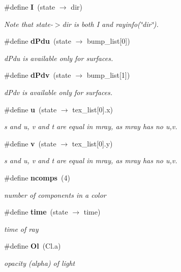 \begin{CompactItemize}
\#define {\bf I}\ (state $\rightarrow$ dir)
\begin{CompactList}\small\item\em Note that state-$>$dir is both I and rayinfo(\char`\"{}dir\char`\"{}). \item\end{CompactList}\item 
\#define {\bf d\-Pdu}\ (state $\rightarrow$ bump\_\-list[0])
\begin{CompactList}\small\item\em d\-Pdu is available only for surfaces. \item\end{CompactList}\item 
\#define {\bf d\-Pdv}\ (state $\rightarrow$ bump\_\-list[1])
\begin{CompactList}\small\item\em d\-Pdv is available only for surfaces. \item\end{CompactList}\item 
\#define {\bf u}\ (state $\rightarrow$ tex\_\-list[0].x)
\begin{CompactList}\small\item\em s and u, v and t are equal in mray, as mray has no u,v. \item\end{CompactList}\item 
\#define {\bf v}\ (state $\rightarrow$ tex\_\-list[0].y)
\begin{CompactList}\small\item\em s and u, v and t are equal in mray, as mray has no u,v. \item\end{CompactList}\item 
\#define {\bf ncomps}\ (4)
\begin{CompactList}\small\item\em number of components in a color \item\end{CompactList}\item 
\#define {\bf time}\ (state $\rightarrow$ time)
\begin{CompactList}\small\item\em time of ray \item\end{CompactList}\item 
\#define {\bf Ol}\ (Cl.a)
\begin{CompactList}\small\item\em opacity (alpha) of light \item\end{CompactList}\item 

\end{CompactItemize}
